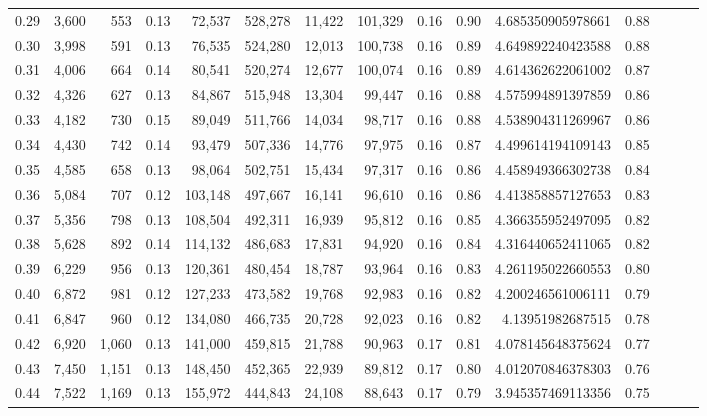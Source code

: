 \begin{tabular}{rrrrrrrrrrrrrrr}
0.29 &   3,600 &    553 &  0.13 &   72,537 &  528,278 &   11,422 &  101,329 &  0.16 &  0.90 &     4.685350905978661 &      0.88 \\
0.30 &   3,998 &    591 &  0.13 &   76,535 &  524,280 &   12,013 &  100,738 &  0.16 &  0.89 &     4.649892240423588 &      0.88 \\
0.31 &   4,006 &    664 &  0.14 &   80,541 &  520,274 &   12,677 &  100,074 &  0.16 &  0.89 &     4.614362622061002 &      0.87 \\
0.32 &   4,326 &    627 &  0.13 &   84,867 &  515,948 &   13,304 &   99,447 &  0.16 &  0.88 &     4.575994891397859 &      0.86 \\
0.33 &   4,182 &    730 &  0.15 &   89,049 &  511,766 &   14,034 &   98,717 &  0.16 &  0.88 &     4.538904311269967 &      0.86 \\
0.34 &   4,430 &    742 &  0.14 &   93,479 &  507,336 &   14,776 &   97,975 &  0.16 &  0.87 &     4.499614194109143 &      0.85 \\
0.35 &   4,585 &    658 &  0.13 &   98,064 &  502,751 &   15,434 &   97,317 &  0.16 &  0.86 &     4.458949366302738 &      0.84 \\
0.36 &   5,084 &    707 &  0.12 &  103,148 &  497,667 &   16,141 &   96,610 &  0.16 &  0.86 &     4.413858857127653 &      0.83 \\
0.37 &   5,356 &    798 &  0.13 &  108,504 &  492,311 &   16,939 &   95,812 &  0.16 &  0.85 &     4.366355952497095 &      0.82 \\
0.38 &   5,628 &    892 &  0.14 &  114,132 &  486,683 &   17,831 &   94,920 &  0.16 &  0.84 &     4.316440652411065 &      0.82 \\
0.39 &   6,229 &    956 &  0.13 &  120,361 &  480,454 &   18,787 &   93,964 &  0.16 &  0.83 &     4.261195022660553 &      0.80 \\
0.40 &   6,872 &    981 &  0.12 &  127,233 &  473,582 &   19,768 &   92,983 &  0.16 &  0.82 &     4.200246561006111 &      0.79 \\
0.41 &   6,847 &    960 &  0.12 &  134,080 &  466,735 &   20,728 &   92,023 &  0.16 &  0.82 &      4.13951982687515 &      0.78 \\
0.42 &   6,920 &  1,060 &  0.13 &  141,000 &  459,815 &   21,788 &   90,963 &  0.17 &  0.81 &     4.078145648375624 &      0.77 \\
0.43 &   7,450 &  1,151 &  0.13 &  148,450 &  452,365 &   22,939 &   89,812 &  0.17 &  0.80 &     4.012070846378303 &      0.76 \\
0.44 &   7,522 &  1,169 &  0.13 &  155,972 &  444,843 &   24,108 &   88,643 &  0.17 &  0.79 &     3.945357469113356 &      0.75 \\

\end{tabular}
